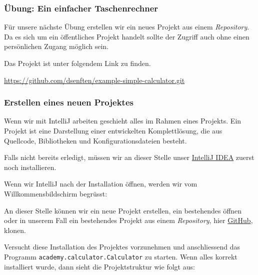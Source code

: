\begin{frame}[fragile]
    \frametitle<presentation>{Übung: Ein einfacher Taschenrechner}
    Für unsere nächste Übung erstellen wir ein neues Projekt aus einem
    \emph{Repository}. Da es sich um ein öffentliches Projekt handelt sollte
    der Zugriff auch ohne einen persönlichen Zugang möglich sein.

    Das Projekt ist unter folgendem Link zu finden.

    \href{https://github.com/dsenften/example-simple-calculator.git}
         {https://github.com/dsenften/example-simple-calculator.git}
\end{frame}

\mode*
\begin{Exercise}[%
title={Ein einfacher Taschenrechner},
label={ex:calculator}]

    \subsubsection*{Erstellen eines neuen Projektes}

    Wenn wir mit IntelliJ arbeiten geschieht alles im Rahmen eines Projekts.
    Ein Projekt ist eine Darstellung einer entwickelten Komplettlösung, die
    aus Quellcode, Bibliotheken und Konfigurationsdateien besteht.

    Falls nicht bereits erledigt, müssen wir an dieser Stelle unser
    \href{https://www.jetbrains.com/idea}{IntelliJ IDEA} zuerst noch installieren.

    Wenn wir IntelliJ nach der Installation öffnen, werden wir vom
    Willkommensbildschirm begrüsst:


    An dieser Stelle können wir ein neue Projekt erstellen, ein bestehendes öffnen
    oder in unserem Fall ein bestehendes Projekt aus einem \emph{Repository}, hier
    \href{https://github.com/dsenften/example-simple-calculator.git}{GitHub},
    klonen.

    Versucht diese Installation des Projektes vorzunehmen und anschliessend
    das Programm \texttt{academy.calculator.Calculator} zu starten. Wenn alles
    korrekt installiert wurde, dann sieht die Projektstruktur wie folgt aus:

    

\end{Exercise}



